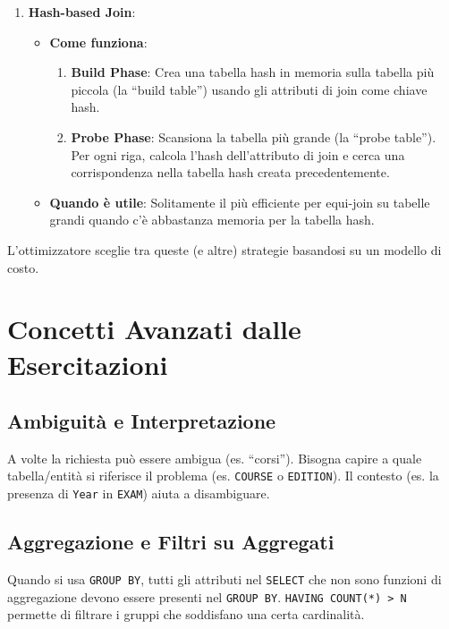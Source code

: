 \begin{enumerate}
    \item \textbf{Hash-based Join}:
    \begin{itemize}
        \item \textbf{Come funziona}:
        \begin{enumerate}
            \item \textbf{Build Phase}: Crea una tabella hash in memoria sulla tabella più piccola (la ``build table'') usando gli attributi di join come chiave hash.
            \item \textbf{Probe Phase}: Scansiona la tabella più grande (la ``probe table''). Per ogni riga, calcola l'hash dell'attributo di join e cerca una corrispondenza nella tabella hash creata precedentemente.
        \end{enumerate}
        \item \textbf{Quando è utile}: Solitamente il più efficiente per equi-join su tabelle grandi quando c'è abbastanza memoria per la tabella hash.
    \end{itemize}
\end{enumerate}
L'ottimizzatore sceglie tra queste (e altre) strategie basandosi su un modello di costo.

\section{Concetti Avanzati dalle Esercitazioni}

\subsection{Ambiguità e Interpretazione}
A volte la richiesta può essere ambigua (es. ``corsi''). Bisogna capire a quale tabella/entità si riferisce il problema (es. \texttt{COURSE} o \texttt{EDITION}). Il contesto (es. la presenza di \texttt{Year} in \texttt{EXAM}) aiuta a disambiguare.

\subsection{Aggregazione e Filtri su Aggregati}
Quando si usa \texttt{GROUP BY}, tutti gli attributi nel \texttt{SELECT} che non sono funzioni di aggregazione devono essere presenti nel \texttt{GROUP BY}.
\texttt{HAVING COUNT(*) > N} permette di filtrare i gruppi che soddisfano una certa cardinalità.

